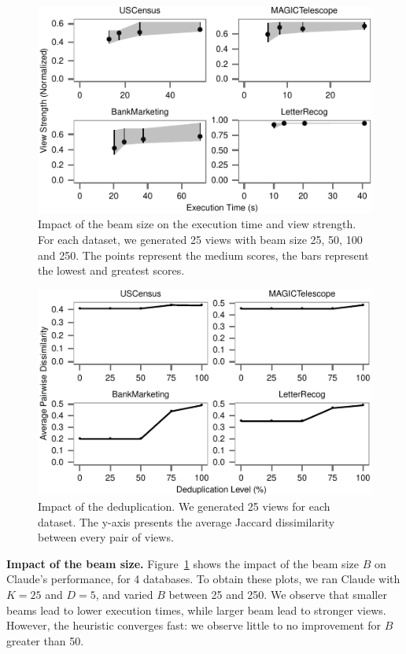 \begin{figure}[t!]
\centering
\includegraphics[width=\columnwidth]{plots/view-vary-beam}
\caption{Impact of the beam size on the execution time and view strength. For
each dataset, we generated 25 views with beam size 25, 50, 100 and 250. The
points represent the medium scores, the bars represent the lowest and greatest
scores.}
\label{pic:view-beam}
\end{figure}
\begin{figure}[t!]
\centering
\includegraphics[width=\columnwidth]{plots/view-vary-diversification}
\caption{Impact of the deduplication. We generated 25 views for each dataset.
The y-axis presents the average Jaccard dissimilarity between every pair of
views.}
\label{pic:view-diversification}
\end{figure}
\textbf{Impact of the beam size.} Figure~\ref{pic:view-beam} shows the impact
of the beam size $B$ on Claude's performance, for 4 databases. To obtain these
plots, we ran Claude with $K=25$ and $D=5$, and varied $B$ between 25 and 250.
We observe that smaller beams lead to lower execution times, while larger beam
lead to stronger views. However, the heuristic converges fast: we observe
little to no improvement for $B$ greater than 50.

